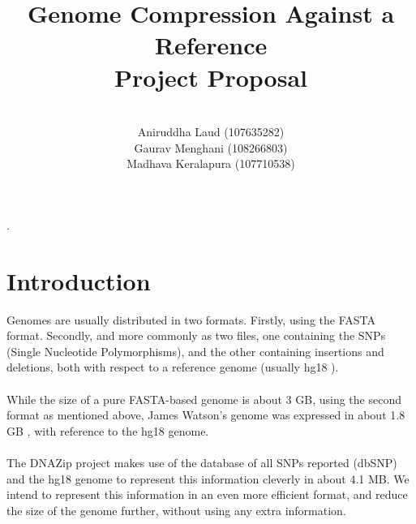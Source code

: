 \documentclass{article}
\title{Genome Compression Against a Reference \\
        Project Proposal \\}
\author{\\
        Aniruddha Laud (107635282)\\
        Gaurav Menghani (108266803)\\
        Madhava Keralapura (107710538)\\}
\begin{document}
\maketitle
.
\clearpage

\tableofcontents

\clearpage

\section {Introduction}
Genomes are usually distributed in two formats. Firstly, using the FASTA format. Secondly, and more
commonly as two files, one containing the SNPs (Single Nucleotide Polymorphisms), and the other containing
insertions and deletions, both with respect to a reference genome (usually hg18 \cite{ucschg, ucschg18}).\\ 
\\
While the size of a pure FASTA-based genome is about 3 GB, using the second format as mentioned above, James Watson's genome was expressed in about 1.8 GB \cite{jwseq}, with reference to the hg18 genome. \\
\\
The DNAZip project \cite{dnazip} makes use of the database of all SNPs reported (dbSNP) and the hg18 genome to represent this information cleverly in about 4.1 MB. We intend to represent this information in an even more efficient format, and reduce the size of the genome further, without using any extra information.
\clearpage
\end{document}
